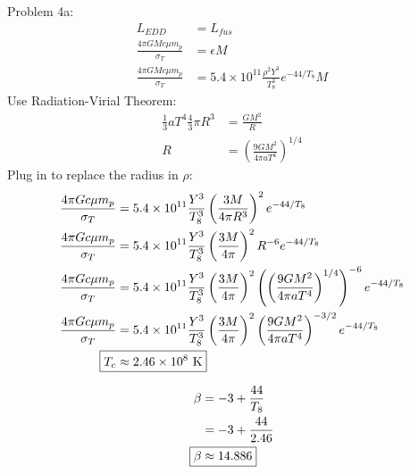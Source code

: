 \documentclass[10pt,letter,preprint]{aastex}
\newcommand{\rp}{\right)}
\newcommand{\lp}{\left(}
\begin{document}
Problem 4a:\\
\begin{align}
L_{EDD} &= L_{fus} \\
 \frac{4 \pi GM c \mu m_p}{\sigma_T}&= \epsilon M\\
 \frac{4 \pi GM c \mu m_p}{\sigma_T}&= 5.4 \times 10^{11} \frac{\rho^2 Y^3}{T_8^3} e^{-44/T_8}M
\end{align}
Use Radiation-Virial Theorem:
\begin{align}
\frac{1}{3}aT^4 \frac{4}{3}\pi R^3 &= \frac{GM^2}{R}\\
R &= \lp \frac{9 GM^2}{4 \pi a T^4} \rp^{1/4}
\end{align}
Plug in to replace the radius in $\rho$:
\begin{align}
\frac{4 \pi G c \mu m_p}{\sigma_T}&= 5.4 \times 10^{11} \frac{ Y^3}{T_8^3} \lp \frac{3M}{4 \pi R^3}\rp^2e^{-44/T_8}\\
\frac{4 \pi G c \mu m_p}{\sigma_T}&= 5.4 \times 10^{11} \frac{ Y^3}{T_8^3} \lp \frac{3M}{4 \pi}\rp^2 R^{-6} e^{-44/T_8}\\
\frac{4 \pi G c \mu m_p}{\sigma_T}&= 5.4 \times 10^{11} \frac{ Y^3}{T_8^3} \lp \frac{3M}{4 \pi}\rp^2 \lp \lp \frac{9 GM^2}{4 \pi a T^4} \rp^{1/4} \rp ^{-6} e^{-44/T_8}\\
\frac{4 \pi Gc \mu m_p}{\sigma_T}&= 5.4 \times 10^{11} \frac{ Y^3}{T_8^3} \lp \frac{3M}{4 \pi}\rp^2 \lp \frac{9 GM^2}{4 \pi a T^4} \rp ^{-3/2} e^{-44/T_8}\\
\Aboxed{T_c &\approx 2.46 \times 10^8\textrm{ K}}
\end{align}

\begin{align}
\beta &= -3 + \frac{44}{T_8}\\
&= -3 + \frac{44}{2.46}\\
\Aboxed{\beta &\approx 14.886}
\end{align}
\end{document}
